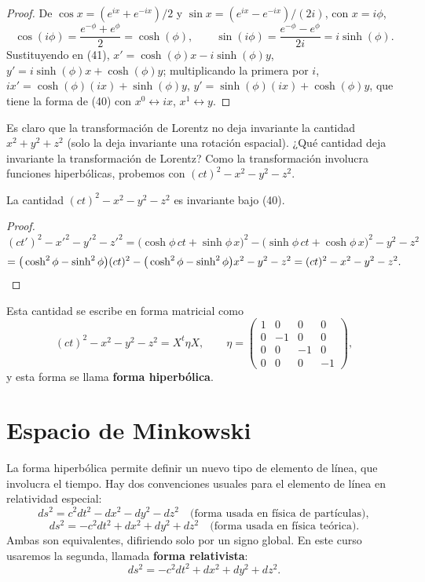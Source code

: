 \begin{proof}
De $\cos x=(e^{ix}+e^{-ix})/2$ y $\sin x=(e^{ix}-e^{-ix})/(2i)$, con
$x=i\phi$,
\[
\cos(i\phi) = \frac{e^{-\phi}+e^{\phi}}{2} = \cosh(\phi), \qquad
\sin(i\phi) = \frac{e^{-\phi}-e^{\phi}}{2i} = i\sinh(\phi).
\]
Sustituyendo en (41), $x'=\cosh(\phi)x-i\sinh(\phi)y$,
$y'=i\sinh(\phi)x+\cosh(\phi)y$; multiplicando la primera por $i$,
$ix'=\cosh(\phi)(ix)+\sinh(\phi)y$, $y'=\sinh(\phi)(ix)+\cosh(\phi)y$,
que tiene la forma de (40) con $x^0\leftrightarrow ix$, $x^1
\leftrightarrow y$. \qedhere
\end{proof}

Es claro que la transformación de Lorentz no deja invariante la
cantidad $x^2+y^2+z^2$ (solo la deja invariante una rotación espacial).
¿Qué cantidad deja invariante la transformación de Lorentz? Como la
transformación involucra funciones hiperbólicas, probemos con
$(ct)^2-x^2-y^2-z^2$.

\begin{proposicionc}
La cantidad $(ct)^2-x^2-y^2-z^2$ es invariante bajo (40).
\end{proposicionc}

\begin{proof}
\[
(ct')^2-x'^2-y'^2-z'^2 = \big(\cosh\phi\,ct+\sinh\phi\,x\big)^2 -
\big(\sinh\phi\,ct+\cosh\phi\,x\big)^2 - y^2-z^2
\]
\[
= \big(\cosh^2\phi-\sinh^2\phi\big)(ct)^2 - \big(\cosh^2\phi-
\sinh^2\phi\big)x^2 - y^2-z^2 = (ct)^2-x^2-y^2-z^2 . \qedhere
\]
\end{proof}

Esta cantidad se escribe en forma matricial como
\[
(ct)^2-x^2-y^2-z^2 = X^t\eta X, \qquad \eta = \begin{pmatrix} 1&0&0&0\\
0&-1&0&0\\ 0&0&-1&0\\ 0&0&0&-1 \end{pmatrix},
\]
y esta forma se llama \textbf{forma hiperbólica}.

\section{Espacio de Minkowski}

La forma hiperbólica permite definir un nuevo tipo de elemento de línea,
que involucra el tiempo. Hay dos convenciones usuales para el elemento
de línea en relatividad especial:
\[
ds^2 = c^2dt^2-dx^2-dy^2-dz^2 \quad\text{(forma usada en física de
partículas)},
\]
\[
ds^2 = -c^2dt^2+dx^2+dy^2+dz^2 \quad\text{(forma usada en física
teórica)}.
\]
Ambas son equivalentes, difiriendo solo por un signo global. En este
curso usaremos la segunda, llamada \textbf{forma relativista}:
\[
ds^2 = -c^2dt^2+dx^2+dy^2+dz^2 .
\]

